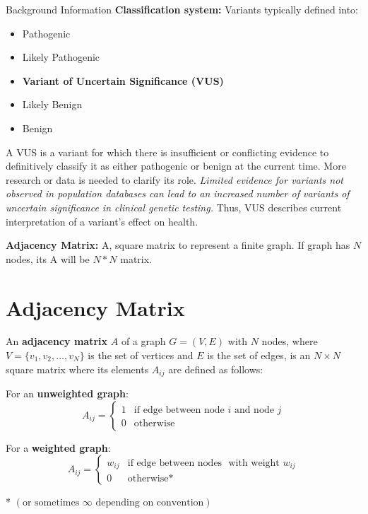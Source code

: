 \documentclass[twocolumn]{article}
\begin{document}
\begin{literaturepaper}{Background Information}
\label{background-info}
\small
\textbf{Classification system:} Variants typically defined into:
\begin{itemize}
    \item Pathogenic
    \item Likely Pathogenic
    \item \textbf{Variant of Uncertain Significance (VUS)}
    \item Likely Benign
    \item Benign
\end{itemize}
A VUS is a variant for which there is insufficient or conflicting evidence to definitively classify it as either pathogenic or benign at the current time. More research or data is needed to clarify its role. \textit{Limited evidence for variants not observed in population databases can lead to an increased number of variants of uncertain significance in clinical genetic testing.} Thus, VUS describes current interpretation of a variant's effect on health.




\textbf{Adjacency Matrix:} A, square matrix to represent a finite graph. If graph has $N$ nodes, its A will be $N * N$ matrix.

\section*{Adjacency Matrix}

An \textbf{adjacency matrix} $A$ of a graph $G = (V, E)$ with $N$ nodes, where $V = \{v_1, v_2, \ldots, v_N\}$ is the set of vertices and $E$ is the set of edges, is an $N \times N$ square matrix where its elements $A_{ij}$ are defined as follows:


For an \textbf{unweighted graph}:
$$
A_{ij} = \begin{cases}
1 & \text{if edge between node } i \text{ and node } j \\
0 & \text{otherwise}
\end{cases}
$$

For a \textbf{weighted graph}:
$$
A_{ij} = \begin{cases}
w_{ij} & \text{if edge between nodes } \text{ with weight } w_{ij} \\
0 & \text{otherwise}*
\end{cases}
$$

* $(\text{or sometimes } \infty \text{ depending on convention})$


\end{literaturepaper}
\end{document}
